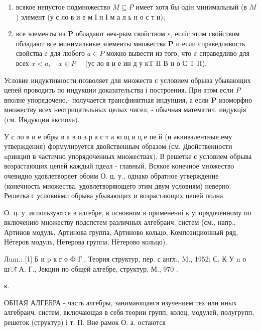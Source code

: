 \documentclass[10pt]{article}
\begin{document}
\begin{enumerate}

  \item всякое непустое подмножество $M \subseteq P$ имеет хотя бы одін минимальный (в $M$ ) элемент (у с ло в и е м І н І м а л ь н о с т и);



  \item все элементы из $\boldsymbol{P}$ обладают нек-рым свойством $\varepsilon$, есліг этим свойством обладают все минимальные элементы множества $\boldsymbol{P}$ и если справедливость свойства $\varepsilon$ для любого $a \in P$ можно вывести из того, что $\varepsilon$ справедливо для всех $x<a, \quad x \in P \quad$ (ус ло в и е ин д у кT II В н о С T II).



\end{enumerate}



Условие индуктивности позволяет для множеств с условием обрыва убывающих цепей проводить по индукции доказательства і построения. При әтом если $P$ вполне упорядочено,- получается трансфинитная индунция, а если $\boldsymbol{P}$ изоморфно множеству всех неотрицательных целых чисел, - обычная математич. индукція (см. Индукции аксиола).



У с ло в и е обры в а в о з р а с т а ю щ и ц е пе й (и әквивалентные ему утверждения) формулируется двойственным образом (см. Двойственности nринцип в частично упорядоченных множествах). В решетке с условием обрыва возрастающих цепей каждый пдеал - главный. Всякое конечное множество очевидно удовлетворяет обоим О. ц. у., однако обратное утверждение (конечность множества, удовлетворяющего этим двум условиям) неверно. Решетка с условиями обрыва убывающих и возрастающих цепей полна.



О. ц. у. используются в алгебре, в основном в применениі к упорядоченному по включению множеству подспстем различных алгебраич. систем (см., напр., Артинов модуль, Артинова группа, Артиново кольцо, Композиционный ряд, Нётеров модуль, Нётерова группа, Нётерово кольцо).



Лum.: [1] Б и p к г о Ф Г., Теория структур, пер. с англ., M., 1952; С. К У n о шा А. Г., Јекции по общей алгебре, структур, М., 970 .

к.



ОБIIАЯ АЛГЕБРА - часть алгебры, занимающаяся изучением тех или иных алгебраич. систем, включающая в себя теории групп, колец, модулей, полугрупп, решеток (структур) і т. П. Вне рамок О. а. остаются
\end{document}
